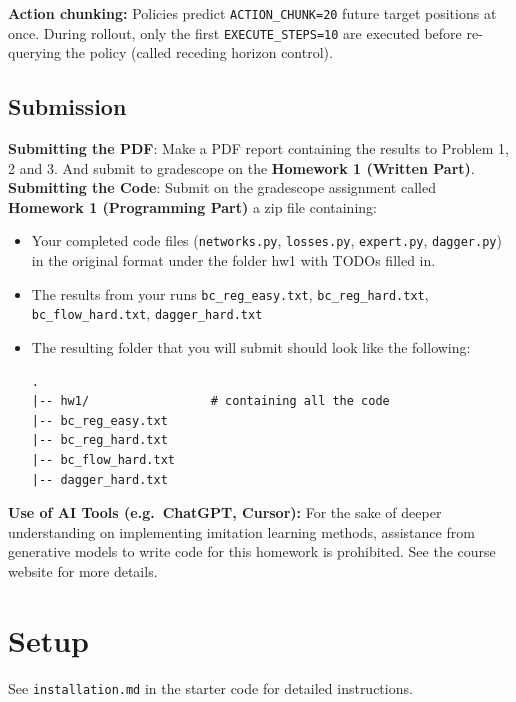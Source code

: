 \documentclass[12pt]{article}
\begin{document}
\noindent\textbf{Action chunking:} Policies predict \texttt{ACTION\_CHUNK=20} future target positions at once. During rollout, only the first \texttt{EXECUTE\_STEPS=10} are executed before re-querying the policy (called receding horizon control).

\subsection*{Submission}

\noindent\textbf{Submitting the PDF}: Make a PDF report containing the results to Problem 1, 2 and 3. And submit to gradescope on the \textbf{Homework 1 (Written Part)}.\\

\noindent\textbf{Submitting the Code}: Submit on the gradescope assignment called \textbf{Homework 1 (Programming Part)} a zip file containing:
\begin{itemize}
\item Your completed code files (\texttt{networks.py}, \texttt{losses.py}, \texttt{expert.py}, \texttt{dagger.py}) in the original format under the folder hw1 with TODOs filled in.
\item The results from your runs \texttt{bc\_reg\_easy.txt}, \texttt{bc\_reg\_hard.txt}, \texttt{bc\_flow\_hard.txt}, \texttt{dagger\_hard.txt}
\item The resulting folder that you will submit should look like the following:\vspace{-1.5em}
\begin{verbatim}
.
|-- hw1/                 # containing all the code
|-- bc_reg_easy.txt
|-- bc_reg_hard.txt
|-- bc_flow_hard.txt
|-- dagger_hard.txt
\end{verbatim}

\end{itemize}

\noindent\textbf{Use of AI Tools (e.g.\ ChatGPT, Cursor):} For the sake of deeper understanding on implementing imitation learning methods, assistance from generative models to write code for this homework is prohibited. See the course website for more details.

\newpage

\section*{Setup}

See \texttt{installation.md} in the starter code for detailed instructions. 
\end{document}
